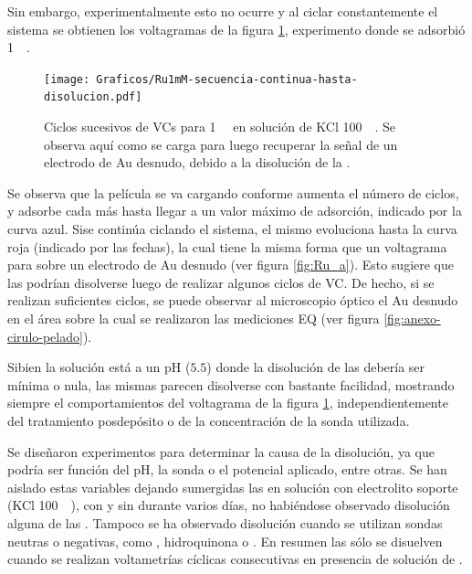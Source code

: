 		Sin embargo, experimentalmente esto no ocurre y al ciclar constantemente el sistema se obtienen los voltagramas de la figura \ref{fig:diso_ru1mM}, experimento donde se adsorbió \ru\space \SI{1}{\milli\Molar}. 
				\begin{figure}[h!]
				\centering
		 	    \texttt{[image: Graficos/Ru1mM-secuencia-continua-hasta-disolucion.pdf]}
		        \caption[Disolución de una \pdmF\space en \ru.]{Ciclos sucesivos de VCs para \ru\space \SI{1}{\milli\Molar} en solución de KCl \SI{100}{\milli\Molar}. Se observa aquí como se carga para luego recuperar la señal de un electrodo de Au desnudo, debido a la disolución de la \pdmF.}
		        \label{fig:diso_ru1mM}
		      	\end{figure} 
		\vspace*{1.5mm} Se observa que la película se va cargando conforme aumenta el número de ciclos, y adsorbe cada más \ru\space hasta llegar a un valor máximo de adsorción, indicado por la curva azul. Si\space se continúa ciclando el sistema, el mismo evoluciona hasta la curva roja (indicado por las fechas), la cual tiene la misma forma que un voltagrama para \ru\space sobre un electrodo de Au desnudo (ver figura \ref{fig:Ru_a}). Esto sugiere que las \pdmF\space podrían disolverse luego de realizar algunos ciclos de VC. De hecho, si se realizan suficientes ciclos, se puede observar al microscopio óptico el Au desnudo en el área sobre la cual se realizaron las mediciones EQ (ver figura \ref{fig:anexo-cirulo-pelado}).

		Si\space bien la solución está a un pH ($5.5$) donde la disolución de las \pdmF\space debería ser mínima o nula, las mismas parecen disolverse con bastante facilidad, mostrando siempre el comportamientos del voltagrama de la figura \ref{fig:diso_ru1mM}, independientemente del tratamiento posdepósito o de la concentración de la sonda utilizada. 

		Se diseñaron experimentos para determinar la causa de la disolución, ya que podría ser función del pH, la sonda o el potencial aplicado, entre otras. Se han aislado estas variables dejando sumergidas las \pdmF\space en solución con electrolito soporte (KCl \SI{100}{\milli\Molar}), con y sin \ru\space durante varios días, no habiéndose observado disolución alguna de las \pdm. Tampoco se ha observado disolución cuando se utilizan sondas neutras o negativas, como \fe, hidroquinona o \fc. En resumen las \pdmF\space sólo se disuelven cuando se realizan voltametrías cíclicas consecutivas en presencia de solución de \ru\space.
		
